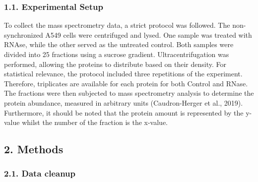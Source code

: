 \documentclass[
  12pt,
]{article}
\begin{document}
\hypertarget{experimental-setup}{%
\subsubsection{1.1. Experimental Setup}\label{experimental-setup}}

\renewcommand{\section}{\titlespacing*{\section}{0pt}{0.3\baselineskip}{0.2\baselineskip}\section}

To collect the mass spectrometry data, a strict protocol was followed.
The non-synchronized A549 cells were centrifuged and lysed. One sample
was treated with RNAse, while the other served as the untreated control.
Both samples were divided into 25 fractions using a sucrose gradient.
Ultracentrifugation was performed, allowing the proteins to distribute
based on their density. For statistical relevance, the protocol included
three repetitions of the experiment. Therefore, triplicates are
available for each protein for both Control and RNase. The fractions
were then subjected to mass spectrometry analysis to determine the
protein abundance, measured in arbitrary units (Caudron-Herger et al.,
2019). Furthermore, it should be noted that the protein amount is
represented by the y-value whilst the number of the fraction is the
x-value.

\hypertarget{methods}{%
\subsection{2. Methods}\label{methods}}

\hypertarget{data-cleanup}{%
\subsubsection{2.1. Data cleanup}\label{data-cleanup}}

\renewcommand{\subsection}{\titlespacing*{\subsection}{0pt}{0.3\baselineskip}{0.2\baselineskip}\subsection}
\end{document}
